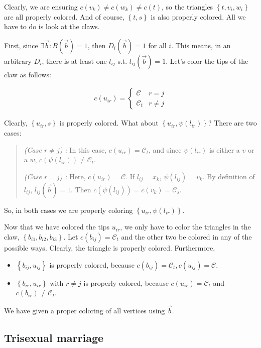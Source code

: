 \documentclass[a4paper, 12pt]{article}
\begin{document}
Clearly, we are ensuring $c(v_k) \neq c(w_k) \neq c(t)$, so the triangles
$\left\{ t, v_i, w_i \right\} $ are all properly colored. And of course,
$\left\{ t, s \right\} $ is also properly colored. All we have to do is look at
the claws.

First, since $\exists \overrightarrow{b} : B(\overrightarrow{b}) = 1$, then
$D_i(\overrightarrow{b}) = 1$ for all $i$. This means, in an arbitrary $D_i$,
there is at least one $l_{ij}$ s.t. $l_{ij}(\overrightarrow{b}) = 1$. Let's 
color the tips of the claw as follows:

\begin{align*}
    c(u_{ir}) = \begin{cases}
        \mathcal{C} & r = j \\ 
        \mathcal{C}_t & r \neq j
    \end{cases}
\end{align*}

Clearly, $\left\{ u_{ir}, s \right\} $ is properly colored. What about $\left\{ u_{ir}, \psi(l_{ir}) \right\} $? There are two cases: 

\begin{quote}
    \textit{(Case $r \neq j$) :} In this case, $c(u_{ir}) = \mathcal{C}_t$, and since $\psi(l_{ir})$ is either a $v$ or a $w$, $c(\psi(l_{ir})) \neq \mathcal{C}_t$. 

    \textit{(Case $r = j$) :} Here, $c(u_{ir}) = \mathcal{C}$. If $l_{ij} = x_k$, $\psi(l_{ij}) = v_k$. By definition of $l_{ij}$, $l_{ij}(\overrightarrow{b}) = 1$. Then $c(\psi(l_{ij})) = c(v_k) = \mathcal{C}_s$. 
\end{quote}

So, in both cases we are properly coloring $\left\{ u_{ir}, \psi(l_{ir})
\right\} $.

Now that we have colored the tips $u_{ir}$, we only have to color the triangles
in the claw, $\left\{ b_{i 1}, b_{i 2}, b_{i 3} \right\} $. Let $c(b_{ij}) =
\mathcal{C}_t$ and the other two be colored in any of the possible ways. Clearly, the triangle is properly colored. Furthermore, 

\begin{itemize}
    \item $\left\{ b_{ij}, u_{ij} \right\} $ is properly colored, because $c(b_{ij}) = \mathcal{C}_t, c(u_{ij}) = \mathcal{C}$. 

    \item $\left\{ b_{ir}, u_{ir} \right\} $ with $r \neq j$ is properly colored, because $c(u_{ir}) = \mathcal{C}_t$ and $c(b_{ir}) \neq \mathcal{C}_t$.
\end{itemize}

We have given a proper coloring of all vertices using $\overrightarrow{b}$.

\subsection{Trisexual marriage}
\end{document}
